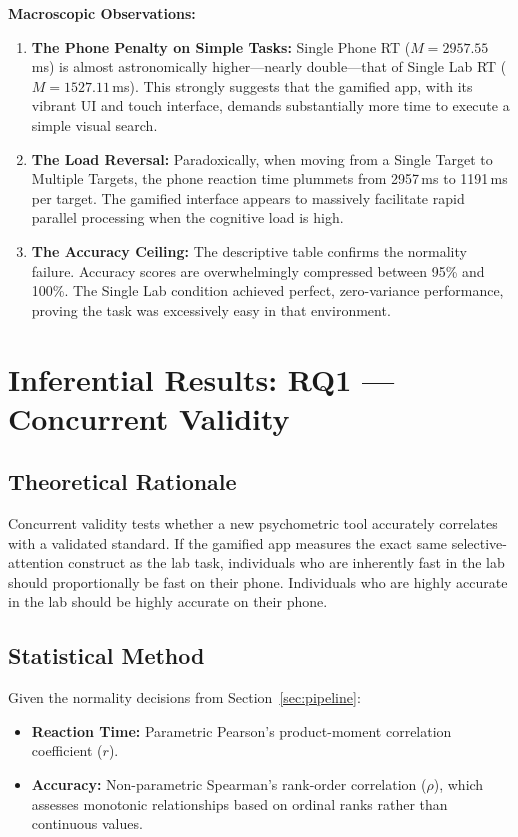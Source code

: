 \documentclass[11pt,a4paper]{article}
\begin{document}
\textbf{Macroscopic Observations:}
\begin{enumerate}
    \item \textbf{The Phone Penalty on Simple Tasks:} Single Phone RT ($M = 2957.55$\,ms) is almost astronomically higher—nearly double—that of Single Lab RT ($M = 1527.11$\,ms). This strongly suggests that the gamified app, with its vibrant UI and touch interface, demands substantially more time to execute a simple visual search.
    \item \textbf{The Load Reversal:} Paradoxically, when moving from a Single Target to Multiple Targets, the phone reaction time plummets from 2957\,ms to 1191\,ms per target. The gamified interface appears to massively facilitate rapid parallel processing when the cognitive load is high.
    \item \textbf{The Accuracy Ceiling:} The descriptive table confirms the normality failure. Accuracy scores are overwhelmingly compressed between 95\% and 100\%. The Single Lab condition achieved perfect, zero-variance performance, proving the task was excessively easy in that environment.
\end{enumerate}

\section{Inferential Results: RQ1 --- Concurrent Validity}
\label{sec:rq1}

\subsection{Theoretical Rationale}
Concurrent validity tests whether a new psychometric tool accurately correlates with a validated standard. If the gamified app measures the exact same selective-attention construct as the lab task, individuals who are inherently fast in the lab should proportionally be fast on their phone. Individuals who are highly accurate in the lab should be highly accurate on their phone.

\subsection{Statistical Method}
Given the normality decisions from Section~\ref{sec:pipeline}:
\begin{itemize}
    \item \textbf{Reaction Time:} Parametric Pearson's product-moment correlation coefficient ($r$).
    \item \textbf{Accuracy:} Non-parametric Spearman's rank-order correlation ($\rho$), which assesses monotonic relationships based on ordinal ranks rather than continuous values.
\end{itemize}
\end{document}
